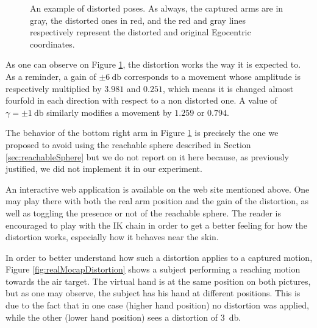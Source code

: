 \begin{figure}[h]
    \caption{An example of distorted poses. As always, the captured arms are in gray, the distorted ones in red, and the red and gray lines respectively represent the distorted and original Egocentric coordinates.}
    \label{fig:distortionExamples}
\end{figure}

As one can observe on Figure \ref{fig:distortionExamples}, the distortion works the way it is expected to. As a reminder, a gain of $\pm\SI{6}{\decibel}$ corresponds to a movement whose amplitude is respectively multiplied by $3.981$ and $0.251$, which means it is changed almost fourfold in each direction with respect to a non distorted one. A value of $\gamma = \pm\SI{1}{\decibel}$ similarly modifies a movement by $1.259$ or $0.794$.

The behavior of the bottom right arm in Figure \ref{fig:distortionExamples} is precisely the one we proposed to avoid using the reachable sphere described in Section \ref{sec:reachableSphere} but we do not report on it here because, as previously justified, we did not implement it in our experiment.

An interactive web application is available on the web site mentioned above. One may play there with both the real arm position and the gain of the distortion, as well as toggling the presence or not of the reachable sphere. The reader is encouraged to play with the IK chain in order to get a better feeling for how the distortion works, especially how it behaves near the skin.

In order to better understand how such a distortion applies to a captured motion, Figure \ref{fig:realMocapDistortion} shows a subject performing a reaching motion towards the air target. The virtual hand is at the same position on both pictures, but as one may observe, the subject has his hand at different positions. This is due to the fact that in one case (higher hand position) no distortion was applied, while the other (lower hand position) sees a distortion of \SI{3}{\decibel}.

